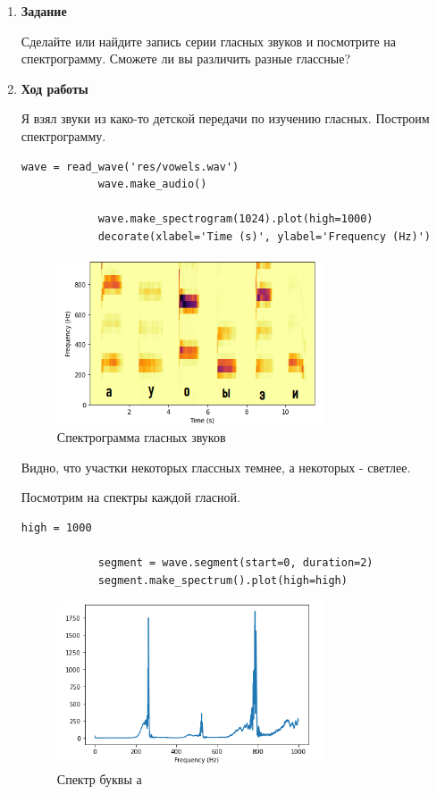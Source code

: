 \documentclass[a4paper,12pt]{article}
\begin{document}
	\begin{enumerate}
		
		\item \textbf{Задание}
		
		Сделайте или найдите запись серии гласных звуков и посмотрите на спектрограмму. Сможете ли вы различить разные глассные?
		
		
		\item \textbf{Ход работы}
		
		Я взял звуки из како-то детской передачи по изучению гласных. Построим спектрограмму.
		\begin{lstlisting}[caption=Построение спектрограммы гласных звуков]
			wave = read_wave('res/vowels.wav')
			wave.make_audio()
			
			wave.make_spectrogram(1024).plot(high=1000)
			decorate(xlabel='Time (s)', ylabel='Frequency (Hz)')
		\end{lstlisting}
		\begin{figure}[H]
			\centering
			\includegraphics[width=0.75\textwidth]{6_1.png}
			\caption{Спектрограмма гласных звуков}
			\label{fig:5.1}
		\end{figure}
		
		Видно, что участки некоторых глассных темнее, а некоторых - светлее.
		
		Посмотрим на спектры каждой гласной.
		\begin{lstlisting}[caption=Спектр буквы а]
			high = 1000
			
			segment = wave.segment(start=0, duration=2)
			segment.make_spectrum().plot(high=high)
		\end{lstlisting}
		\begin{figure}[H]
			\centering
			\includegraphics[width=0.75\textwidth]{6_2.png}
			\caption{Спектр буквы а}
			\label{fig:6.2}
		\end{figure}
		

\end{enumerate}
\end{document}

